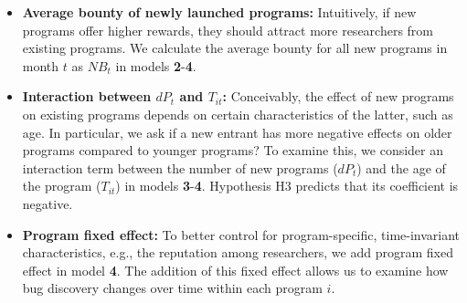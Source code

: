 \begin{itemize}
  \item \textbf{Average bounty of newly launched programs:} Intuitively, if new programs offer higher rewards, they should attract more researchers from existing programs. We calculate the average bounty for all new programs in month $t$ as $NB_t$ in models {\bf 2}-{\bf 4}.
  
  \item \textbf{Interaction between $dP_t$ and $T_{it}$:} Conceivably, the effect of new programs on existing programs depends on certain characteristics of the latter, such as age. In particular, we ask if a new entrant has more negative effects on older programs compared to younger programs? To examine this, we consider an interaction term between the number of new programs ($dP_t$) and the age of the program ($T_{it}$) in models {\bf 3}-{\bf 4}. Hypothesis H3 predicts that its coefficient is negative.
  
  \item \textbf{Program fixed effect:} To better control for program-specific, time-invariant characteristics, e.g., the reputation among researchers, we add program fixed effect in model {\bf 4}. The addition of this fixed effect allows us to examine how bug discovery changes over time within each program $i$.
\end{itemize}

